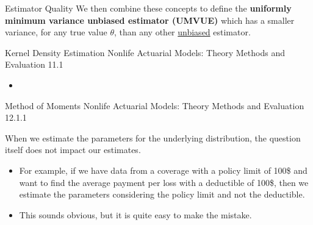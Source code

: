 \begin{CHPT_SUMM_AUTO_NUMB}[label = {L.-25}]{Estimator Quality}
We then combine these concepts to define the \textbf{uniformly minimum variance unbiased estimator (UMVUE)} which has a smaller variance, for any true value $\theta$, than any other \underline{unbiased} estimator.
\end{CHPT_SUMM_AUTO_NUMB}

\begin{CHPT_SUMM_AUTO_NUMB}[label = {L.-26}]{Kernel Density Estimation}
Nonlife Actuarial Models: Theory Methods and Evaluation 11.1
\tcbline
\begin{itemize}
		\item	
	\end{itemize}
\end{CHPT_SUMM_AUTO_NUMB}

\begin{CHPT_SUMM_AUTO_NUMB}[label = {L.-27}]{Method of Moments}
Nonlife Actuarial Models: Theory Methods and Evaluation 12.1.1

\tcbline

When we estimate the parameters for the underlying distribution, the question itself does not impact our estimates. 
\begin{itemize}[leftmargin = *]
	\item	For example, if we have data from a coverage with a policy limit of 100\$ and want to find the average payment per loss with a deductible of 100\$, then we estimate the parameters considering the policy limit and not the deductible.
	\item	This sounds obvious, but it is quite easy to make the mistake.
\end{itemize}

\tcbline


\end{CHPT_SUMM_AUTO_NUMB}
